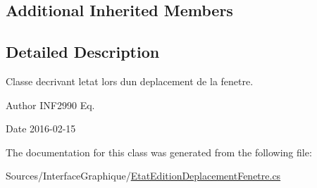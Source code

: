 \subsection*{Additional Inherited Members}


\subsection{Detailed Description}
Classe decrivant l\textquotesingle{}etat lors d\textquotesingle{}un deplacement de la fenetre. 

\begin{DoxyAuthor}{Author}
I\+N\+F2990 Eq. 
\end{DoxyAuthor}
\begin{DoxyDate}{Date}
2016-\/02-\/15 
\end{DoxyDate}


The documentation for this class was generated from the following file\+:\begin{DoxyCompactItemize}
\item 
Sources/\+Interface\+Graphique/\hyperlink{_etat_edition_deplacement_fenetre_8cs}{Etat\+Edition\+Deplacement\+Fenetre.\+cs}\end{DoxyCompactItemize}

